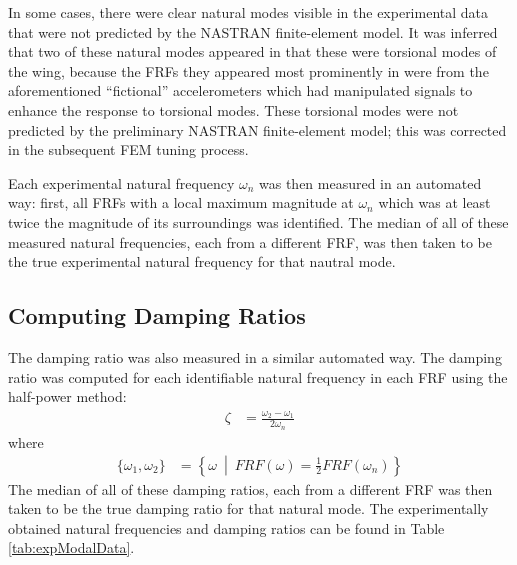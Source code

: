 In some cases, there were clear natural modes visible in the experimental data that were not predicted by the NASTRAN finite-element model. It was inferred that two of these natural modes appeared in that these were torsional modes of the wing, because the FRFs they appeared most prominently in were from the aforementioned ``fictional'' accelerometers which had manipulated signals to enhance the response to torsional modes. These torsional modes were not predicted by the preliminary NASTRAN finite-element model; this was corrected in the subsequent FEM tuning process.

Each experimental natural frequency $\omega_n$ was then measured in an automated way: first, all FRFs with a local maximum magnitude at $\omega_n$ which was at least twice the magnitude of its surroundings was identified. The median of all of these measured natural frequencies, each from a different FRF, was then taken to be the true experimental natural frequency for that nautral mode.

\subsection{Computing Damping Ratios}

The damping ratio was also measured in a similar automated way. The damping ratio was computed for each identifiable natural frequency in each FRF using the half-power method:
\begin{align}
	\zeta &= \frac{\omega_2 - \omega_1}{2\omega_n}
\end{align}
where
\begin{align}
	\{\omega_1,\omega_2\} &= \left\{\omega \ \middle| \ FRF(\omega) = \frac{1}{2} FRF(\omega_n)\right\}
\end{align}
The median of all of these damping ratios, each from a different FRF was then taken to be the true damping ratio for that natural mode. The experimentally obtained natural frequencies and damping ratios can be found in Table \ref{tab:expModalData}.

